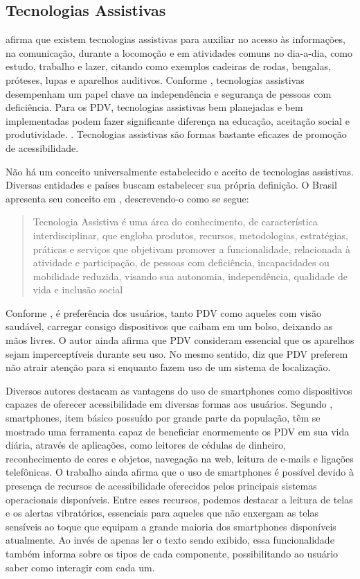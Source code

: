 \documentclass[twoside,english,brazilian]{UNISINOSartigo}
\begin{document}
\subsection{Tecnologias Assistivas}
 afirma que existem tecnologias assistivas para auxiliar no acesso às informações, na comunicação, durante a locomoção e em atividades comuns no dia-a-dia, como estudo, trabalho e lazer, citando como exemplos cadeiras de rodas, bengalas, próteses, lupas e aparelhos auditivos. Conforme , tecnologias assistivas desempenham um papel chave na independência e segurança de pessoas com deficiência. Para os PDV, tecnologias assistivas bem planejadas e bem implementadas podem fazer significante diferença na educação, aceitação social e produtividade. \cite{dias2015navpal}. Tecnologias assistivas são formas bastante eficazes de promoção de acessibilidade.

Não há um conceito universalmente estabelecido e aceito de tecnologias assistivas. Diversas entidades e países buscam estabelecer sua própria definição. O Brasil apresenta seu conceito em \cite{TA2009}, descrevendo-o como se segue:
\begin{quote}
	Tecnologia Assistiva é uma área do conhecimento, de característica interdisciplinar, que
	engloba produtos, recursos, metodologias, estratégias, práticas e serviços que objetivam promover
	a funcionalidade, relacionada à atividade e participação, de pessoas com deficiência,
	incapacidades ou mobilidade reduzida, visando sua autonomia, independência, qualidade de vida e
	inclusão social
\end{quote}

Conforme , é preferência dos usuários, tanto PDV como aqueles com visão saudável, carregar consigo dispositivos que caibam em um bolso, deixando as mãos livres. O autor ainda afirma que PDV consideram essencial que os aparelhos sejam imperceptíveis durante seu uso. No mesmo sentido,  diz que PDV preferem não atrair atenção para si enquanto fazem uso de um sistema de localização.

Diversos autores destacam as vantagens do uso de smartphones como dispositivos capazes de oferecer acessibilidade em diversas formas aos usuários. Segundo , smartphones, item básico possuído por grande parte da população, têm se mostrado uma ferramenta capaz de beneficiar enormemente os PDV em sua vida diária, através de aplicações, como leitores de cédulas de dinheiro, reconhecimento de cores e objetos, navegação na web, leitura de e-mails e ligações telefônicas. O trabalho ainda afirma que o uso de smartphones é possível devido à presença de recursos de acessibilidade oferecidos pelos principais sistemas operacionais disponíveis. Entre esses recursos, podemos destacar a leitura de telas e os alertas vibratórios, essenciais para aqueles que não enxergam as telas sensíveis ao toque que equipam a grande maioria dos smartphones disponíveis atualmente. Ao invés de apenas ler o texto sendo exibido, essa funcionalidade também informa sobre os tipos de cada componente, possibilitando ao usuário saber como interagir com cada um.
\end{document}
